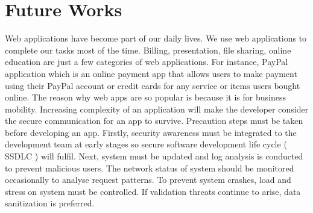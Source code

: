 \documentclass[a4paper,12pt]{article}
\begin{document}
\section{Future Works}
Web applications have become part of our daily lives. We use web applications to complete our tasks most of the time. Billing, presentation, file sharing, online education are just a few categories of web applications. For instance, PayPal application which is an online payment app that allows users to make payment using their PayPal account or credit cards for any service or items users bought online. The reason why web apps are so popular is because it is for business mobility. Increasing complexity of an application will make the developer consider the secure communication for an app to survive. Precaution steps must be taken before developing an app. Firstly, security awareness must be integrated to the development team at early stages so secure software development life cycle ( SSDLC ) will fulfil. Next, system must be updated and log analysis is conducted to prevent malicious users. The network status of system should be monitored occasionally to analyse request patterns. To prevent system crashes, load and stress on system must be controlled. If validation threats continue to arise, data sanitization is preferred. 
\end{document}
